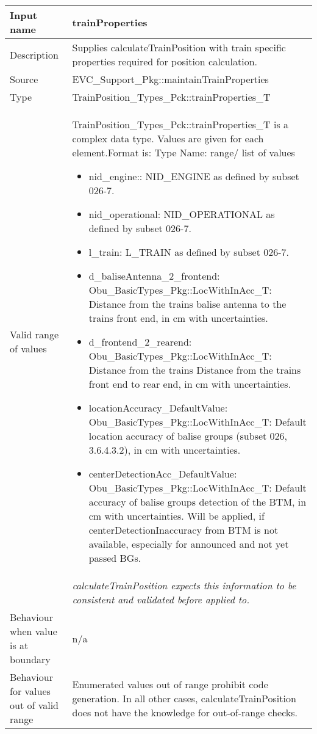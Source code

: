 \begin{longtable}{p{}p{}}
\toprule
Input name				& trainProperties \\

\midrule
Description				& Supplies calculateTrainPosition with train specific properties required for position calculation.   \\
\midrule
Source					& EVC\_Support\_Pkg::maintainTrainProperties \\ 
\midrule
Type					& TrainPosition\_Types\_Pck::trainProperties\_T \\  
\midrule
Valid range of values	& TrainPosition\_Types\_Pck::trainProperties\_T is a complex data type. Values are given for each element.\newline Format is: Type Name: range/ list of values
\begin{itemize}
\item nid\_engine:: NID\_ENGINE as defined by subset 026-7. 
\item nid\_operational: NID\_OPERATIONAL as defined by subset 026-7. 
\item l\_train: L\_TRAIN as defined by subset 026-7. 

\item d\_baliseAntenna\_2\_frontend: Obu\_BasicTypes\_Pkg::LocWithInAcc\_T:  Distance from the trains balise antenna to the trains front end, in cm with uncertainties. 

\item d\_frontend\_2\_rearend: Obu\_BasicTypes\_Pkg::LocWithInAcc\_T:  Distance from the trains Distance from the trains front end to rear end, in cm with uncertainties. 

\item locationAccuracy\_DefaultValue: Obu\_BasicTypes\_Pkg::LocWithInAcc\_T:  Default location accuracy of balise groups (subset 026, 3.6.4.3.2), in cm with uncertainties. 

\item centerDetectionAcc\_DefaultValue: Obu\_BasicTypes\_Pkg::LocWithInAcc\_T:  Default  accuracy of balise groups detection of the BTM, in cm with uncertainties. Will be applied, if centerDetectionInaccuracy from BTM is not available, especially for announced and not yet passed BGs. 

\end{itemize}  \\

                     	&  \emph{calculateTrainPosition expects this information to be consistent and validated before applied to.}
\\

\midrule
Behaviour when value is at boundary	& n/a \\
\midrule
Behaviour for values out of valid range	& Enumerated values out of range prohibit code generation. In all other cases, calculateTrainPosition does not have the knowledge for out-of-range checks. \\

\bottomrule
\end{longtable}



